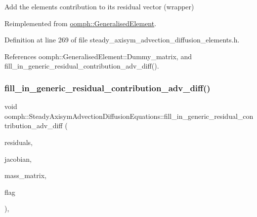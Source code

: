 Add the element\textquotesingle{}s contribution to its residual vector (wrapper) 



Reimplemented from \hyperlink{classoomph_1_1GeneralisedElement_a310c97f515e8504a48179c0e72c550d7}{oomph\+::\+Generalised\+Element}.



Definition at line 269 of file steady\+\_\+axisym\+\_\+advection\+\_\+diffusion\+\_\+elements.\+h.



References oomph\+::\+Generalised\+Element\+::\+Dummy\+\_\+matrix, and fill\+\_\+in\+\_\+generic\+\_\+residual\+\_\+contribution\+\_\+adv\+\_\+diff().

\mbox{\label{classoomph_1_1SteadyAxisymAdvectionDiffusionEquations_aa284f6d5072e793b2f363241d9d2c3ba}} 
\subsubsection{\texorpdfstring{fill\+\_\+in\+\_\+generic\+\_\+residual\+\_\+contribution\+\_\+adv\+\_\+diff()}{fill\_in\_generic\_residual\_contribution\_adv\_diff()}}
{\footnotesize\ttfamily void oomph\+::\+Steady\+Axisym\+Advection\+Diffusion\+Equations\+::fill\+\_\+in\+\_\+generic\+\_\+residual\+\_\+contribution\+\_\+adv\+\_\+diff (\begin{DoxyParamCaption}\item[{\hyperlink{classoomph_1_1Vector}{Vector}$<$ double $>$ \&}]{residuals,  }\item[{\hyperlink{classoomph_1_1DenseMatrix}{Dense\+Matrix}$<$ double $>$ \&}]{jacobian,  }\item[{\hyperlink{classoomph_1_1DenseMatrix}{Dense\+Matrix}$<$ double $>$ \&}]{mass\+\_\+matrix,  }\item[{unsigned}]{flag }\end{DoxyParamCaption})\hspace{0.3cm}{\ttfamily [protected]}, {\ttfamily [virtual]}}



